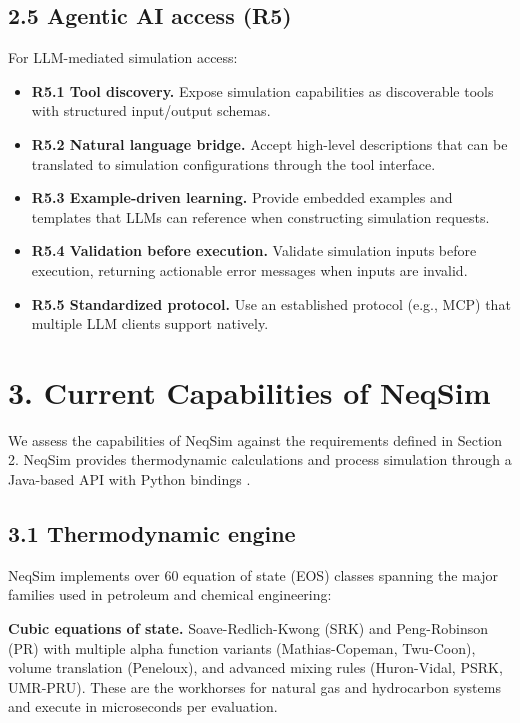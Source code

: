 \documentclass[review,3p]{custom}
\begin{document}
\subsection{2.5 Agentic AI access (R5)}

For LLM-mediated simulation access:

\begin{itemize}
  \item \textbf{R5.1 Tool discovery.} Expose simulation capabilities as discoverable tools with structured input/output schemas.
  \item \textbf{R5.2 Natural language bridge.} Accept high-level descriptions that can be translated to simulation configurations through the tool interface.
  \item \textbf{R5.3 Example-driven learning.} Provide embedded examples and templates that LLMs can reference when constructing simulation requests.
  \item \textbf{R5.4 Validation before execution.} Validate simulation inputs before execution, returning actionable error messages when inputs are invalid.
  \item \textbf{R5.5 Standardized protocol.} Use an established protocol (e.g., MCP) that multiple LLM clients support natively.
\end{itemize}


\section{3. Current Capabilities of NeqSim}

We assess the capabilities of NeqSim against the requirements defined in Section 2. NeqSim provides thermodynamic calculations and process simulation through a Java-based API with Python bindings \cite{NeqSim2024}.

\subsection{3.1 Thermodynamic engine}

NeqSim implements over 60 equation of state (EOS) classes spanning the major families used in petroleum and chemical engineering:

\textbf{Cubic equations of state.} Soave-Redlich-Kwong (SRK) \cite{Soave1972} and Peng-Robinson (PR) \cite{PengRobinson1976} with multiple alpha function variants (Mathias-Copeman, Twu-Coon), volume translation (Peneloux), and advanced mixing rules (Huron-Vidal, PSRK, UMR-PRU). These are the workhorses for natural gas and hydrocarbon systems and execute in microseconds per evaluation.
\end{document}
